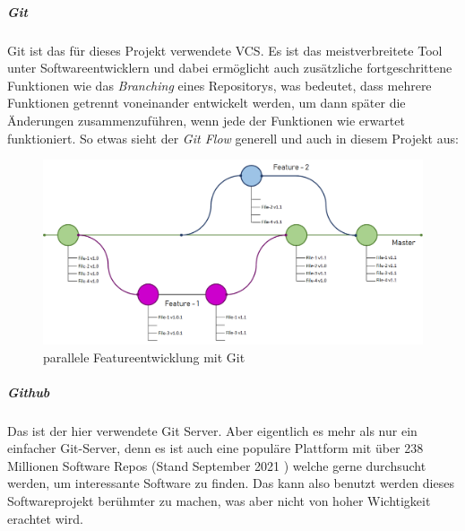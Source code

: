 \documentclass[a4paper,11pt]{article}
\begin{document}
\subparagraph{Git}
Git ist das für dieses Projekt verwendete VCS. Es ist das meistverbreitete Tool unter Softwareentwicklern und dabei ermöglicht auch zusätzliche fortgeschrittene Funktionen wie das \textit{Branching} eines Repositorys, was bedeutet, dass mehrere Funktionen getrennt voneinander entwickelt werden, um dann später die Änderungen zusammenzuführen, wenn jede der Funktionen wie erwartet funktioniert. So etwas sieht der \textit{Git Flow} generell und auch in diesem Projekt aus:

\begin{figure}[H]
    \centering
    \includegraphics[width=.8\textwidth]{media/gitflow.png}
    \caption{parallele Featureentwicklung mit Git \cite{gitflowBlog}}
\end{figure}

\subparagraph{Github}

Das ist der hier verwendete Git Server. Aber eigentlich es mehr als nur ein einfacher Git-Server, denn es ist auch eine populäre Plattform mit über 238 Millionen Software Repos (Stand September 2021 \cite{githubRepoQuery}) welche gerne durchsucht werden, um interessante Software zu finden. Das kann also benutzt werden dieses Softwareprojekt berühmter zu machen, was aber nicht von hoher Wichtigkeit erachtet wird.
\end{document}
